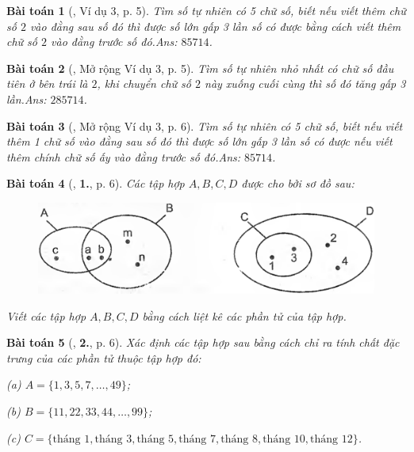 \documentclass{article}
\numberwithin{equation}{section}
\newtheorem{baitoan}{Bài toán}
\begin{document}
\begin{baitoan}[\cite{Binh_Toan_6_tap_1}, Ví dụ 3, p. 5]
	Tìm số tự nhiên có 5 chữ số, biết nếu viết thêm chữ số $2$ vào đằng sau số đó thì được số lớn gấp 3 lần số có được bằng cách viết thêm chữ số $2$ vào đằng trước số đó.\hfill\textsf{Ans:} $85714$.
\end{baitoan}

\begin{baitoan}[\cite{Binh_Toan_6_tap_1}, Mở rộng Ví dụ 3, p. 5]
	Tìm số tự nhiên nhỏ nhất có chữ số đầu tiên ở bên trái là $2$, khi chuyển chữ số $2$ này xuống cuối cùng thì số đó tăng gấp 3 lần.\hfill\textsf{Ans:} $285714$.
\end{baitoan}

\begin{baitoan}[\cite{Binh_Toan_6_tap_1}, Mở rộng Ví dụ 3, p. 6]
	Tìm số tự nhiên có 5 chữ số, biết nếu viết thêm 1 chữ số vào đằng sau số đó thì được số lớn gấp 3 lần số có được nếu viết thêm chính chữ số ấy vào đằng trước số đó.\hfill\textsf{Ans:} $85714$.
\end{baitoan}

\begin{baitoan}[\cite{Binh_Toan_6_tap_1}, \textbf{1.}, p. 6]
	Các tập hợp $A,B,C,D$ được cho bởi sơ đồ sau:
	\begin{figure}[H]
		\centering
		\includegraphics[scale=0.12]{Binh_1_p_6}
	\end{figure}
	Viết các tập hợp $A,B,C,D$ bằng cách liệt kê các phần tử của tập hợp.
\end{baitoan}

\begin{baitoan}[\cite{Binh_Toan_6_tap_1}, \textbf{2.}, p. 6]
	Xác định các tập hợp sau bằng cách chỉ ra tính chất đặc trưng của các phần tử thuộc tập hợp đó:
	\begin{enumerate*}
		\item[(a)] $A = \{1,3,5,7,\ldots,49\}$;
		\item[(b)] $B = \{11,22,33,44,\ldots,99\}$;\\
		\item[(c)] $C = \{\mbox{tháng } 1,\mbox{tháng } 3,\mbox{tháng } 5,\mbox{tháng } 7,\mbox{tháng } 8,\mbox{tháng } 10,\mbox{tháng } 12\}$.
	\end{enumerate*}
\end{baitoan}
\end{document}
